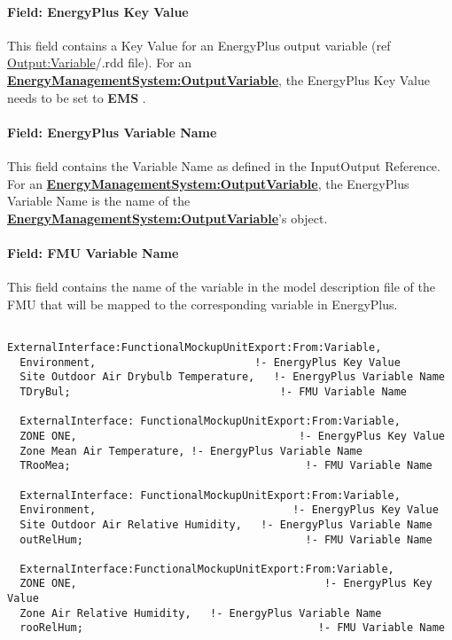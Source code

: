 \paragraph{Field: EnergyPlus Key Value}\label{field-energyplus-key-value-1}

This field contains a Key Value for an EnergyPlus output variable (ref \hyperref[outputvariable]{Output:Variable}/.rdd file). For an \textbf{\hyperref[energymanagementsystemoutputvariable]{EnergyManagementSystem:OutputVariable}}, the EnergyPlus Key Value needs to be set to \textbf{EMS} .

\paragraph{Field: EnergyPlus Variable Name}\label{field-energyplus-variable-name-4}

This field contains the Variable Name as defined in the InputOutput Reference. For an \textbf{\hyperref[energymanagementsystemoutputvariable]{EnergyManagementSystem:OutputVariable}}, the EnergyPlus Variable Name is the name of the \textbf{\hyperref[energymanagementsystemoutputvariable]{EnergyManagementSystem:OutputVariable}}'s object.

\paragraph{Field: FMU Variable Name}\label{field-fmu-variable-name-4}

This field contains the name of the variable in the model description file of the FMU that will be mapped to the corresponding variable in EnergyPlus.

\begin{lstlisting}

ExternalInterface:FunctionalMockupUnitExport:From:Variable,
  Environment,                         !- EnergyPlus Key Value
  Site Outdoor Air Drybulb Temperature,   !- EnergyPlus Variable Name
  TDryBul;                                 !- FMU Variable Name

  ExternalInterface: FunctionalMockupUnitExport:From:Variable,
  ZONE ONE,                                   !- EnergyPlus Key Value
  Zone Mean Air Temperature, !- EnergyPlus Variable Name
  TRooMea;                                     !- FMU Variable Name

  ExternalInterface: FunctionalMockupUnitExport:From:Variable,
  Environment,                               !- EnergyPlus Key Value
  Site Outdoor Air Relative Humidity,   !- EnergyPlus Variable Name
  outRelHum;                                   !- FMU Variable Name

  ExternalInterface:FunctionalMockupUnitExport:From:Variable,
  ZONE ONE,                                       !- EnergyPlus Key Value
  Zone Air Relative Humidity,   !- EnergyPlus Variable Name
  rooRelHum;                                     !- FMU Variable Name
\end{lstlisting}

